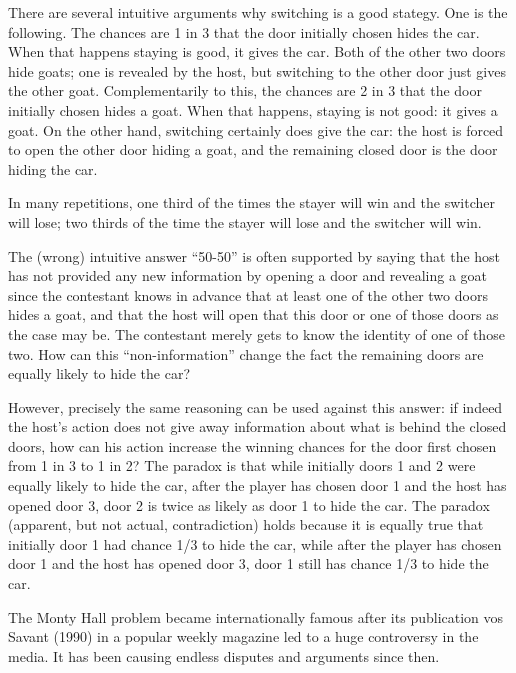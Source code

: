 There are several intuitive arguments why switching is a good stategy. One is the following. The chances are 1 in 3 that the door initially chosen hides the car. When that happens staying is good, it gives the car. Both of the other two doors hide goats; one is revealed by the host, but switching to the other door just gives the other goat. Complementarily to this, the chances are 2 in 3 that the door initially chosen hides a goat. When that happens, staying is not good: it gives a goat. On the other hand, switching certainly does give the car: the host is forced to open the other door hiding a goat, and the remaining closed door is the door hiding the car.

In many repetitions, one third of the times the stayer will win and the switcher will lose; two thirds of the time the stayer will lose and the switcher will win.

The (wrong) intuitive answer ``50-50'' is often supported by saying that the host has not provided any new information by opening a door and revealing a goat since the contestant knows in advance that at least one of the other two doors hides a goat, and that the host will open that this door or one of those doors as the case may be. The contestant merely gets to know the identity of one of those two. How can this ``non-information'' change the fact the remaining doors are equally likely to hide the car?

However, precisely the same reasoning can be used against this answer: if indeed the host's action does not give away information about what is behind the closed doors, how can his action increase the winning chances for the door first chosen from 1 in 3 to 1 in 2? The paradox is that while initially doors 1 and 2 were equally likely to hide the car, after the player has chosen door 1 and the host has opened door 3, door 2 is twice as likely as door 1 to hide the car. The paradox (apparent, but not actual, contradiction) holds because it is equally true that initially door 1 had chance 1/3 to hide the car, while after the player has chosen door 1 and the host has opened door 3, door 1 still has chance 1/3 to hide the car.

The Monty Hall problem became internationally famous after its publication vos Savant (1990) in a popular weekly magazine led to a huge controversy in the media. It has been causing endless disputes and arguments since then.

